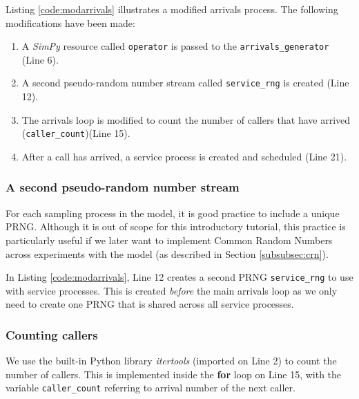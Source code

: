 \documentclass{swpaperproc}
\theoremstyle{sw}
\begin{document}
Listing \ref{code:modarrivals} illustrates a modified arrivals process.  The following modifications have been made:

\begin{enumerate}
    \item A \textit{SimPy} resource called \verb|operator| is passed to the \verb|arrivals_generator| (Line 6).
    \item A second pseudo-random number stream called \verb|service_rng| is created (Line 12).
    \item The arrivals loop is modified to count the number of callers that have arrived (\verb|caller_count|)(Line 15).
    \item After a call has arrived, a service process is created and scheduled (Line 21).
    
\end{enumerate}



\subsubsection{A second pseudo-random number stream}

For each sampling process in the model, it is good practice to include a unique PRNG. Although it is out of scope for this introductory tutorial, this practice is particularly useful if we later want to implement Common Random Numbers across experiments with the model (as described in Section \ref{subsubsec:crn}).

In Listing \ref{code:modarrivals}, Line 12 creates a second PRNG \verb|service_rng| to use with service processes. This is created \textit{before} the main arrivals loop as we only need to create one PRNG that is shared across all service processes. 

\subsubsection{Counting callers}

We use the built-in Python library \textit{itertools} (imported on Line 2) to count the number of callers. This is implemented inside the \textbf{for} loop on Line 15, with the variable \verb|caller_count| referring to arrival number of the next caller.
\end{document}
